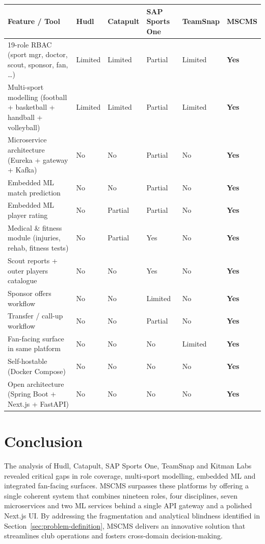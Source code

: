 \documentclass[12pt,a4paper,oneside]{report}
\begin{document}
\begin{longtable}{p{} p{} p{} p{} p{} p{}}
  \toprule
  \textbf{Feature / Tool} & \textbf{Hudl} & \textbf{Catapult} &
  \textbf{SAP Sports One} & \textbf{TeamSnap} & \textbf{MSCMS} \\
  \midrule
  19-role RBAC (sport mgr, doctor, scout, sponsor, fan, \ldots) &
  Limited & Limited & Partial & Limited & \textbf{Yes} \\
  \midrule
  Multi-sport modelling (football + basketball + handball + volleyball) &
  Limited & Limited & Partial & Limited & \textbf{Yes} \\
  \midrule
  Microservice architecture (Eureka + gateway + Kafka) &
  No & No & Partial & No & \textbf{Yes} \\
  \midrule
  Embedded ML match prediction &
  No & No & Partial & No & \textbf{Yes} \\
  \midrule
  Embedded ML player rating &
  No & Partial & Partial & No & \textbf{Yes} \\
  \midrule
  Medical \& fitness module (injuries, rehab, fitness tests) &
  No & Partial & Yes & No & \textbf{Yes} \\
  \midrule
  Scout reports + outer players catalogue &
  No & No & Yes & No & \textbf{Yes} \\
  \midrule
  Sponsor offers workflow &
  No & No & Limited & No & \textbf{Yes} \\
  \midrule
  Transfer / call-up workflow &
  No & No & Partial & No & \textbf{Yes} \\
  \midrule
  Fan-facing surface in same platform &
  No & No & No & Limited & \textbf{Yes} \\
  \midrule
  Self-hostable (Docker Compose) &
  No & No & No & No & \textbf{Yes} \\
  \midrule
  Open architecture (Spring Boot + Next.js + FastAPI) &
  No & No & No & No & \textbf{Yes} \\
  \bottomrule
\end{longtable}

\section{Conclusion}

The analysis of Hudl, Catapult, SAP Sports One, TeamSnap and Kitman
Labs revealed critical gaps in role coverage, multi-sport modelling,
embedded ML and integrated fan-facing surfaces. MSCMS surpasses these
platforms by offering a single coherent system that combines nineteen
roles, four disciplines, seven microservices and two ML services
behind a single API gateway and a polished Next.js UI. By addressing
the fragmentation and analytical blindness identified in
Section~\ref{sec:problem-definition}, MSCMS delivers an innovative
solution that streamlines club operations and fosters cross-domain
decision-making.
\end{document}
